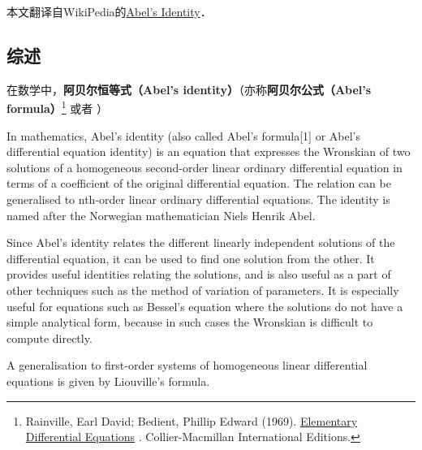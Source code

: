 
本文翻译自WikiPedia的\href{https://en.wikipedia.org/wiki/Abel\%27s_identity}{Abel's Identity}．


\subsection{综述}

在数学中，\textbf{阿贝尔恒等式（Abel's identity）}（亦称\textbf{阿贝尔公式（Abel's formula）}\footnote{ Rainville, Earl David; Bedient, Phillip Edward (1969). \href{https://archive.org/details/elementarydiffer00rain}{ Elementary Differential Equations} . Collier-Macmillan International Editions.} 或者 ）

In mathematics, Abel's identity (also called Abel's formula[1] or Abel's differential equation identity) is an equation that expresses the Wronskian of two solutions of a homogeneous second-order linear ordinary differential equation in terms of a coefficient of the original differential equation. The relation can be generalised to nth-order linear ordinary differential equations. The identity is named after the Norwegian mathematician Niels Henrik Abel.

Since Abel's identity relates the different linearly independent solutions of the differential equation, it can be used to find one solution from the other. It provides useful identities relating the solutions, and is also useful as a part of other techniques such as the method of variation of parameters. It is especially useful for equations such as Bessel's equation where the solutions do not have a simple analytical form, because in such cases the Wronskian is difficult to compute directly.

A generalisation to first-order systems of homogeneous linear differential equations is given by Liouville's formula.







